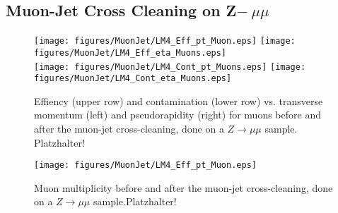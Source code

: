 \documentclass{cmspaper}
\begin{document}
\begin{appendix}
\clearpage
\section{Muon-Jet Cross Cleaning on Z$-\>\mu\mu$}
\label{app:Zmumu}

\begin{figure}[hb]
\begin{center}
    \texttt{[image: figures/MuonJet/LM4\_Eff\_pt\_Muon.eps]}
    \texttt{[image: figures/MuonJet/LM4\_Eff\_eta\_Muons.eps]}\\
    \texttt{[image: figures/MuonJet/LM4\_Cont\_pt\_Muons.eps]}
    \texttt{[image: figures/MuonJet/LM4\_Cont\_eta\_Muons.eps]}
    \caption{Effiency (upper row) and contamination (lower row) vs. transverse
    momentum (left) and pseudorapidity (right) for muons before and after the
    muon-jet cross-cleaning, done on a \(Z\rightarrow\mu\mu\) sample.
    {\color{red}Platzhalter!}}
    \label{fig:effCont_muon_MuonJet_Zmumu}
\end{center}
\end{figure}

\begin{figure}[hb]
\begin{center}
    \texttt{[image: figures/MuonJet/LM4\_Eff\_pt\_Muon.eps]}
    \caption{Muon multiplicity before and after the muon-jet cross-cleaning,
    done on a \(Z\rightarrow\mu\mu\) sample.{\color{red}Platzhalter!}}
    \label{fig:muon_mult_MuonJet_Zmumu}
\end{center}
\end{figure}



\end{appendix}
\end{document}
